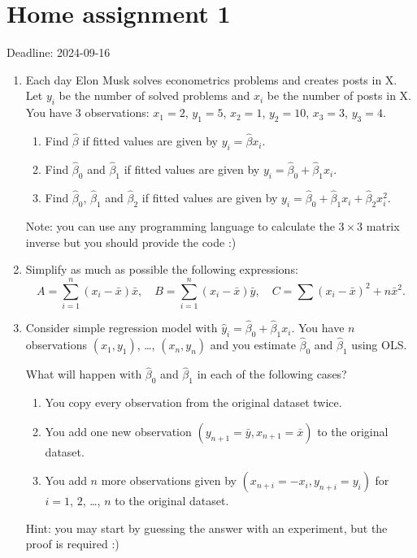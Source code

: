 \documentclass[12pt]{article}
\newcommand{\hb}{\hat{\beta}}
\begin{document}
\section*{Home assignment 1}

Deadline: 2024-09-16

\begin{enumerate}
\item Each day Elon Musk solves econometrics problems and creates posts in X.
Let $y_i$ be the number of solved problems and $x_i$ be the number of posts in X. 
You have 3 observations: $x_1 = 2$, $y_1 = 5$, $x_2 = 1$, $y_2 = 10$, $x_3 = 3$, $y_3 = 4$.

\begin{enumerate}
    \item Find $\hb$ if fitted values are given by $y_i = \hb x_i$.
    \item Find $\hb_0$ and $\hb_1$ if fitted values are given by $y_i = \hb_0 + \hb_1 x_i$.
    \item Find $\hb_0$, $\hb_1$ and $\hb_2$ if fitted values are given by $y_i = \hb_0 + \hb_1 x_i + \hb_2 x_i^2$.
\end{enumerate}

Note: you can use any programming language to calculate the $3\times 3$ matrix inverse but you should provide the code :)

\item Simplify as much as possible the following expressions:
\[
A = \sum_{i=1}^n (x_i - \bar x)\bar x, \quad B = \sum_{i=1}^n (x_i - \bar x)\bar y, \quad C = \sum (x_i - \bar x)^2 + n \bar x^2.
\]

\item  Consider simple regression model with $\hat y_i = \hb_0 + \hb_1 x_i$.
You have $n$ observations $(x_1, y_1)$, \dots, $(x_n, y_n)$ and you estimate $\hb_0$ and $\hb_1$ using OLS. 

What will happen with $\hb_0$ and $\hb_1$ in each of the following cases?

\begin{enumerate}
    \item You copy every observation from the original dataset twice.
    \item You add one new observation $(y_{n+1} = \bar y, x_{n+1} = \bar x)$ to the original dataset.
    \item You add $n$ more observations given by $(x_{n+i} = -x_i, y_{n+i} = y_i)$ for $i = 1$, $2$, \dots, $n$ to the original dataset.
\end{enumerate}

Hint: you may start by guessing the answer with an experiment, but the proof is required :)

\end{enumerate}
\end{document}
